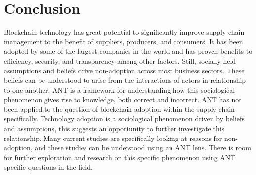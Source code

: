 \section{Conclusion}

Blockchain technology has great potential to significantly improve supply-chain management to the benefit of suppliers, producers, and consumers. It has been adopted by some of the largest companies in the world and has proven benefits to efficiency, security, and transparency among other factors. Still, socially held assumptions and beliefs drive non-adoption across most business sectors. These beliefs can be understood to arise from the interactions of actors in relationship to one another. ANT is a framework for understanding how this sociological phenomenon gives rise to knowledge, both correct and incorrect. ANT has not been applied to the question of blockchain adoption within the supply chain specifically. Technology adoption is a sociological phenomenon driven by beliefs and assumptions, this suggests an opportunity to further investigate this relationship. Many current studies are specifically looking at reasons for non-adoption, and these studies can be understood using an ANT lens. There is room for further exploration and research on this specific phenomenon using ANT specific questions in the field.
